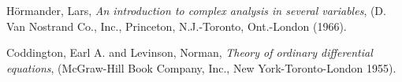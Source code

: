 \documentclass[a4paper,11pt]{article}
\theoremstyle{remark}
\begin{document}
\begin{thebibliography}{10}

{\sc H\"ormander, Lars},
{\it An introduction to complex analysis in several variables},
(D. Van Nostrand Co., Inc., Princeton, N.J.-Toronto, Ont.-London (1966).

{\sc Coddington, Earl A. and Levinson, Norman},
{\it Theory of ordinary differential equations},
(McGraw-Hill Book Company, Inc., New York-Toronto-London 1955).

%
%
%
%
%
%
%
%
%
%

\end{thebibliography}
\end{document}
